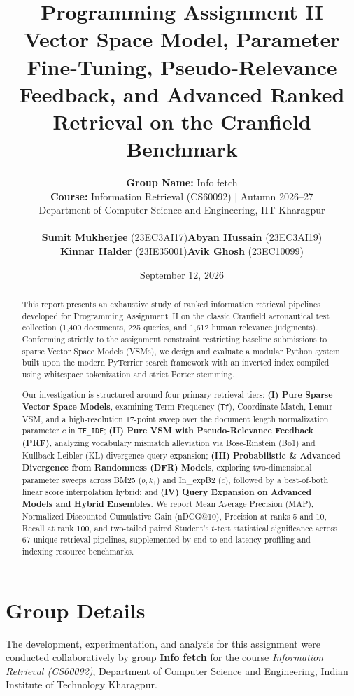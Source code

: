 \documentclass[10pt, a4paper]{article}
\title{
    \vspace{-1.5cm}
    \textbf{\LARGE Programming Assignment II}\\[0.3cm]
    \Large Vector Space Model, Parameter Fine-Tuning, Pseudo-Relevance Feedback, and Advanced Ranked Retrieval on the Cranfield Benchmark
}
\author{
    \textbf{Group Name:} Info fetch \\[0.15cm]
    \textbf{Course:} Information Retrieval (CS60092) | Autumn 2026--27 \\
    Department of Computer Science and Engineering, IIT Kharagpur \\[0.3cm]
    \begin{tabular}{ll}
        \textbf{Sumit Mukherjee} (23EC3AI17) & \textbf{Abyan Hussain} (23EC3AI19) \\ 
        \textbf{Kinnar Halder} (23IE35001)   & \textbf{Avik Ghosh} (23EC10099)
    \end{tabular}
}
\date{September 12, 2026}
\begin{document}
\maketitle
\begin{abstract}
This report presents an exhaustive study of ranked information retrieval pipelines developed for Programming Assignment~II on the classic Cranfield aeronautical test collection (1,400 documents, 225 queries, and 1,612 human relevance judgments). Conforming strictly to the assignment constraint restricting baseline submissions to sparse Vector Space Models (VSMs), we design and evaluate a modular Python system built upon the modern PyTerrier search framework with an inverted index compiled using whitespace tokenization and strict Porter stemming. 

Our investigation is structured around four primary retrieval tiers: \textbf{(I) Pure Sparse Vector Space Models}, examining Term Frequency (\texttt{Tf}), Coordinate Match, Lemur VSM, and a high-resolution 17-point sweep over the document length normalization parameter $c$ in \texttt{TF\_IDF}; \textbf{(II) Pure VSM with Pseudo-Relevance Feedback (PRF)}, analyzing vocabulary mismatch alleviation via Bose-Einstein (Bo1) and Kullback-Leibler (KL) divergence query expansion; \textbf{(III) Probabilistic \& Advanced Divergence from Randomness (DFR) Models}, exploring two-dimensional parameter sweeps across BM25 ($b, k_1$) and In\_expB2 ($c$), followed by a best-of-both linear score interpolation hybrid; and \textbf{(IV) Query Expansion on Advanced Models and Hybrid Ensembles}. We report Mean Average Precision (MAP), Normalized Discounted Cumulative Gain (\mbox{nDCG@10}), Precision at ranks 5 and 10, Recall at rank 100, and two-tailed paired Student's $t$-test statistical significance across 67 unique retrieval pipelines, supplemented by end-to-end latency profiling and indexing resource benchmarks.
\end{abstract}

\tableofcontents
\newpage

\section{Group Details}
\label{sec:group_details}

The development, experimentation, and analysis for this assignment were conducted collaboratively by group \textbf{Info fetch} for the course \textit{Information Retrieval (CS60092)}, Department of Computer Science and Engineering, Indian Institute of Technology Kharagpur.
\end{document}
